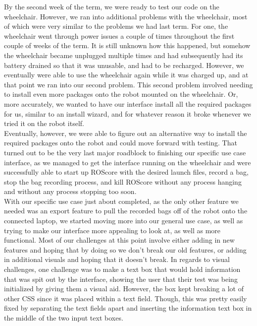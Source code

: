\documentclass[onecolumn, draftclsnofoot,10pt, compsoc]{IEEEtran}
\begin{document}
By the second week of the term, we were ready to test our code on the wheelchair. However, we ran into additional problems with the wheelchair, most of which were very similar to the problems we had last term. For one, the wheelchair went through power issues a couple of times throughout the first couple of weeks of the term. It is still unknown how this happened, but somehow the wheelchair became unplugged multiple times and had subsequently had its battery drained so that it was unusable, and had to be recharged. However, we eventually were able to use the wheelchair again while it was charged up, and at that point we ran into our second problem. This second problem involved needing to install even more packages onto the robot mounted on the wheelchair. Or, more accurately, we wanted to have our interface install all the required packages for us, similar to an install wizard, and for whatever reason it broke whenever we tried it on the robot itself.\\

Eventually, however, we were able to figure out an alternative way to install the required packages onto the robot and could move forward with testing. That turned out to be the very last major roadblock to finishing our specific use case interface, as we managed to get the interface running on the wheelchair and were successfully able to start up ROScore with the desired launch files, record a bag, stop the bag recording process, and kill ROScore without any process hanging and without any process stopping too soon.\\

With our specific use case just about completed, as the only other feature we needed was an export feature to pull the recorded bags off of the robot onto the connected laptop, we started moving more into our general use case, as well as trying to make our interface more appealing to look at, as well as more functional. Most of our challenges at this point involve either adding in new features and hoping that by doing so we don't break our old features, or adding in additional visuals and hoping that it doesn't break. In regards to visual challenges, one challenge was to make a text box that would hold information that was spit out by the interface, showing the user that their test was being initialized by giving them a visual aid. However, the box kept breaking a lot of other CSS since it was placed within a text field. Though, this was pretty easily fixed by separating the text fields apart and inserting the information text box in the middle of the two input text boxes.\\
\end{document}
